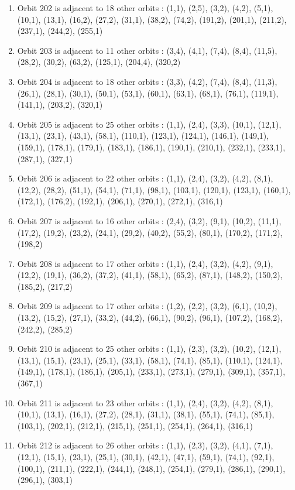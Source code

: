 \documentclass[12pt]{article}
\begin{document}
\begin{enumerate}
\item Orbit 202 is adjacent to 18 other orbits : (1,1), (2,5), (3,2), (4,2), (5,1), (10,1), (13,1), (16,2), (27,2), (31,1), (38,2), (74,2), (191,2), (201,1), (211,2), (237,1), (244,2), (255,1)
\item Orbit 203 is adjacent to 11 other orbits : (3,4), (4,1), (7,4), (8,4), (11,5), (28,2), (30,2), (63,2), (125,1), (204,4), (320,2)
\item Orbit 204 is adjacent to 18 other orbits : (3,3), (4,2), (7,4), (8,4), (11,3), (26,1), (28,1), (30,1), (50,1), (53,1), (60,1), (63,1), (68,1), (76,1), (119,1), (141,1), (203,2), (320,1)
\item Orbit 205 is adjacent to 25 other orbits : (1,1), (2,4), (3,3), (10,1), (12,1), (13,1), (23,1), (43,1), (58,1), (110,1), (123,1), (124,1), (146,1), (149,1), (159,1), (178,1), (179,1), (183,1), (186,1), (190,1), (210,1), (232,1), (233,1), (287,1), (327,1)
\item Orbit 206 is adjacent to 22 other orbits : (1,1), (2,4), (3,2), (4,2), (8,1), (12,2), (28,2), (51,1), (54,1), (71,1), (98,1), (103,1), (120,1), (123,1), (160,1), (172,1), (176,2), (192,1), (206,1), (270,1), (272,1), (316,1)
\item Orbit 207 is adjacent to 16 other orbits : (2,4), (3,2), (9,1), (10,2), (11,1), (17,2), (19,2), (23,2), (24,1), (29,2), (40,2), (55,2), (80,1), (170,2), (171,2), (198,2)
\item Orbit 208 is adjacent to 17 other orbits : (1,1), (2,4), (3,2), (4,2), (9,1), (12,2), (19,1), (36,2), (37,2), (41,1), (58,1), (65,2), (87,1), (148,2), (150,2), (185,2), (217,2)
\item Orbit 209 is adjacent to 17 other orbits : (1,2), (2,2), (3,2), (6,1), (10,2), (13,2), (15,2), (27,1), (33,2), (44,2), (66,1), (90,2), (96,1), (107,2), (168,2), (242,2), (285,2)
\item Orbit 210 is adjacent to 25 other orbits : (1,1), (2,3), (3,2), (10,2), (12,1), (13,1), (15,1), (23,1), (25,1), (33,1), (58,1), (74,1), (85,1), (110,1), (124,1), (149,1), (178,1), (186,1), (205,1), (233,1), (273,1), (279,1), (309,1), (357,1), (367,1)
\item Orbit 211 is adjacent to 23 other orbits : (1,1), (2,4), (3,2), (4,2), (8,1), (10,1), (13,1), (16,1), (27,2), (28,1), (31,1), (38,1), (55,1), (74,1), (85,1), (103,1), (202,1), (212,1), (215,1), (251,1), (254,1), (264,1), (316,1)
\item Orbit 212 is adjacent to 26 other orbits : (1,1), (2,3), (3,2), (4,1), (7,1), (12,1), (15,1), (23,1), (25,1), (30,1), (42,1), (47,1), (59,1), (74,1), (92,1), (100,1), (211,1), (222,1), (244,1), (248,1), (254,1), (279,1), (286,1), (290,1), (296,1), (303,1)

\end{enumerate}
\end{document}
